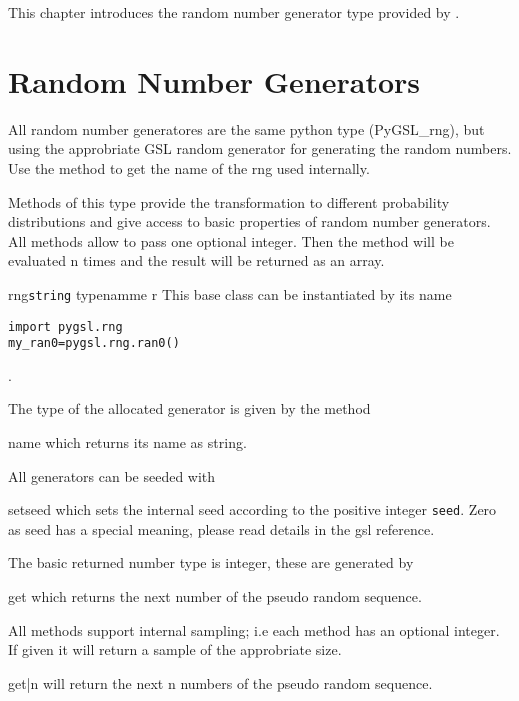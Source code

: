 
%
%
%

This chapter introduces the random number generator type provided by .

\section{Random Number Generators}

All random number generatores are the same python type (PyGSL_rng), but using the
approbriate GSL random generator for generating the random numbers. Use the method
 to get the name of the rng used internally.

Methods of
this type  provide the transformation to different probability
distributions and give access to basic properties of random number generators. 
All methods allow to pass one optional integer. Then the method will be evaluated n times and the result
will be returned as an array.

\begin{pytypedesc}{rng}{\texttt{string} typenamme \code{|}  r}
  This base class can be instantiated by its name
\begin{verbatim}
import pygsl.rng
my_ran0=pygsl.rng.ran0()
\end{verbatim}
.
\end{pytypedesc}
The type of the allocated generator is given by the method
\begin{methoddesc}{name}{}
  which returns its name as string.
\end{methoddesc}
All generators can be seeded with
\begin{methoddesc}{set}{seed}
  which sets the internal seed according to the positive integer {\tt seed}. Zero as seed
  has a special meaning, please read details in the gsl reference.
\end{methoddesc}
The basic returned number type is integer, these are generated by
\begin{methoddesc}{get}{}
  which returns the next number of the pseudo random sequence.
\end{methoddesc}
All methods support internal sampling; i.e each method has an optional integer. 
If given it will return a sample of the approbriate size.
\begin{methoddesc}{get}{|n}
  will return the next n numbers of the pseudo random sequence.
\end{methoddesc}

